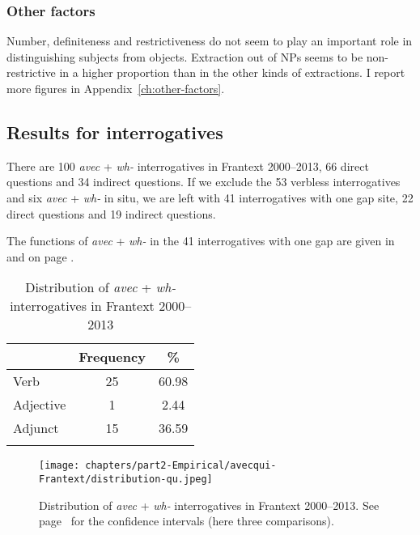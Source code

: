 \subsubsection{Other factors}

Number, definiteness and restrictiveness do not seem to play an important role in distinguishing subjects from objects. Extraction out of NPs seems to be non-restrictive in a higher proportion than in the other kinds of extractions. I report more figures in Appendix~\ref{ch:other-factors}.

\subsection{Results for interrogatives}

There are 100 \emph{avec} + \emph{wh-} interrogatives in Frantext 2000--2013, 66 direct questions and 34 indirect questions. If we exclude the 53 verbless interrogatives and six \emph{avec} + \emph{wh-} in situ, we are left with 41 interrogatives with one gap site, 22 direct questions and 19 indirect questions.

The functions of \emph{avec} + \emph{wh-} in the 41 interrogatives with one gap are given in  and on  page \pageref{tab:avecq-wh}. 

\begin{table}
    \begin{tabular}{l S[table-format=2] S[table-format=2.2]}
         \lsptoprule
                   & {Frequency} & {\%} \\\midrule
         Verb      & 25 & 60.98 \\
         Adjective & 1 & 2.44 \\
         Adjunct   & 15 & 36.59 \\
         \lspbottomrule
    \end{tabular}
    \caption{Distribution of \emph{avec} + \emph{wh-} interrogatives in Frantext 2000--2013}
    \label{tab:avecq-wh}
\end{table}

\begin{figure}
    \centering
    \texttt{[image: chapters/part2-Empirical/avecqui-Frantext/distribution-qu.jpeg]}
    \caption[Distribution of \emph{avec} + \emph{wh-} interrogatives in Frantext 2000--2013]{Distribution of \emph{avec} + \emph{wh-} interrogatives in Frantext 2000--2013. See page~\pageref{ch:conf-intervals-binomial} for the confidence intervals (here three comparisons).}
    \label{fig:avecq-wh}
\end{figure}

